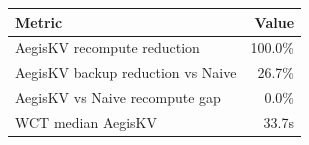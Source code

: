 \begin{tabular}{lr}
\toprule
Metric & Value \\
\midrule
AegisKV recompute reduction & 100.0\% \\
AegisKV backup reduction vs Naive & 26.7\% \\
AegisKV vs Naive recompute gap & 0.0\% \\
WCT median AegisKV & 33.7s \\
\bottomrule
\end{tabular}
